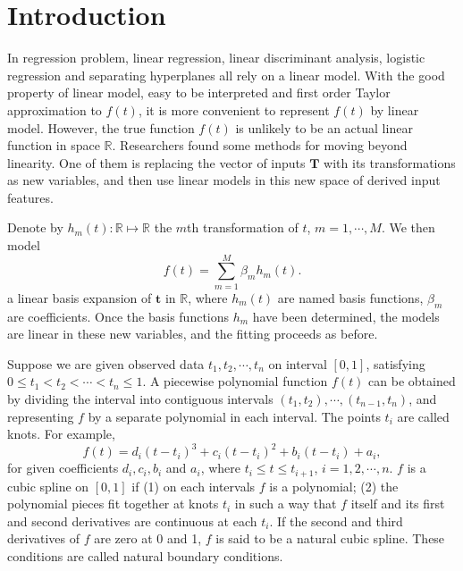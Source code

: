 \section{Introduction}


In regression problem, linear regression, linear discriminant analysis, logistic regression and separating hyperplanes all rely on a linear model. With the good property of linear model, easy to be interpreted and first order Taylor approximation to $f(t)$, it is more convenient to represent $f(t)$ by linear model. However, the true function $f(t)$ is unlikely to be an actual linear function in space $\mathbb{R}$. Researchers found some methods for moving beyond linearity. One of them is replacing the vector of inputs $\mathbf{T}$ with its transformations as new variables, and then use linear models in this new space of derived input features.

Denote by $h_m(t):\mathbb{R} \mapsto \mathbb{R}$ the $m$th transformation of $t$, $m =1, \cdots ,M$. We then model
\begin{equation}\label{fbasis}
f(t) =\sum_{m=1}^{M}\beta_mh_m(t).
\end{equation}
a linear basis expansion of $\mathbf{t}$ in $\mathbb{R}$, where $h_m(t)$ are named basis functions, $\beta_m$ are coefficients. Once the basis functions $h_m$ have been determined, the models are linear in these new variables, and the fitting proceeds as before.

Suppose we are given observed data $t_1,t_2, \cdots, t_n$ on interval $[0,1]$, satisfying $0\leq t_1< t_2 < \cdots <t_n \leq 1$. A piecewise polynomial function $f(t)$ can be obtained by dividing the interval into contiguous
intervals $(t_1,t_2),\cdots,(t_{n-1},t_n)$, and representing $f$ by a separate polynomial in each interval. The points $t_i$ are called knots. For example,
\begin{equation}
f(t)=d_i(t-t_i)^3+c_i(t-t_i)^2+b_i(t-t_i)+a_i,
\end{equation}
for given coefficients $d_i, c_i, b_i$ and $a_i$, where $t_i\leq t\leq t_{i+1}$, $i=1,2,\cdots,n$. $f$ is a cubic spline on $[0,1]$ if (1) on each intervals $f$ is a polynomial; (2) the polynomial pieces fit together at knots $t_i$ in such a way that $f$ itself and its first and second derivatives are continuous at each $t_i$. If the second and third derivatives of $f$ are zero at 0 and 1, $f$ is said to be a natural cubic spline. These conditions are called natural boundary conditions.

